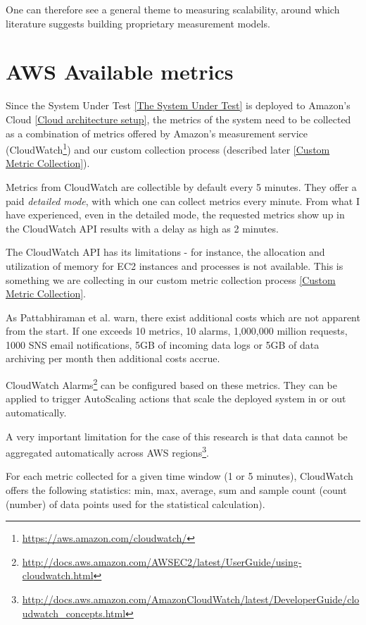 \documentclass{uvamscse}
\begin{document}
One can therefore see a general theme to measuring scalability, around which literature suggests building proprietary measurement models.

\section{AWS Available metrics} \label{AWS Available metrics}

Since the System Under Test \ref{The System Under Test} is deployed to Amazon's Cloud \ref{Cloud architecture setup}, the metrics of the system need to be collected as a combination of metrics offered by Amazon's measurement service (CloudWatch\footnote{\url{https://aws.amazon.com/cloudwatch/}}) and our custom collection process (described later \ref{Custom Metric Collection}).

Metrics from CloudWatch are collectible by default every 5 minutes. They offer a paid \textit{detailed mode}, with which one can collect metrics every minute. From what I have experienced, even in the detailed mode, the requested metrics show up in the CloudWatch API results with a delay as high as 2 minutes.

The CloudWatch API has its limitations - for instance, the allocation and utilization of memory for EC2 instances and processes is not available. This is something we are collecting in our custom metric collection process \ref{Custom Metric Collection}.

As Pattabhiraman et al. \cite{Models} warn, there exist additional costs which are not apparent from the start.
If one exceeds 10 metrics, 10 alarms, 1,000,000 million requests, 1000 SNS email notifications, 5GB of incoming data logs or 5GB of data archiving per month then additional costs accrue.

CloudWatch Alarms\footnote{\url{http://docs.aws.amazon.com/AWSEC2/latest/UserGuide/using-cloudwatch.html}} can be configured based on these metrics. They can be applied to trigger AutoScaling actions that scale the deployed system in or out automatically.

A very important limitation for the case of this research is that data cannot be aggregated automatically across AWS regions\footnote{\url{http://docs.aws.amazon.com/AmazonCloudWatch/latest/DeveloperGuide/cloudwatch_concepts.html}}.

For each metric collected for a given time window (1 or 5 minutes), CloudWatch offers the following statistics: min, max, average, sum and sample count (count (number) of data points used for the statistical calculation).
\end{document}
